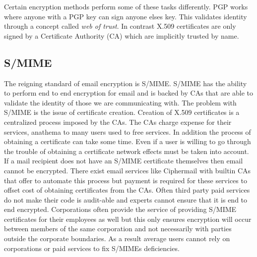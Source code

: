 \documentclass[11pt]{article}
\begin{document}
Certain encryption methods perform some of these tasks differently. PGP works where anyone with a PGP key can sign anyone elses key. This validates identity through a concept called \textit{web of trust}. In contrast X.509 certificates are only signed by a Certificate Authority (CA) which are implicitly trusted by name.

\subsection{S/MIME}
\par The reigning standard of email encryption is S/MIME. S/MIME has the ability to perform end to end encryption for email and is backed by CAs that are able to validate the identity of those we are communicating with. The problem with S/MIME is the issue of certificate creation. Creation of X.509 certificates is a centralized process imposed by the CAs\cite{garfinkel2005johnny}. The CAs charge expense for their services, anathema to many users used to free services. In addition the process of obtaining a certificate can take some time. Even if a user is willing to go through the trouble of obtaining a certificate network effects must be taken into account. If a mail recipient does not have an S/MIME certificate themselves then email cannot be encrypted. There exist email services like Ciphermail with builtin CAs \cite{ciphermail-gateway} that offer to automate this process but payment is required for these services to offset cost of obtaining certificates from the CAs. Often third party paid services do not make their code is audit-able and experts cannot ensure that it is end to end encrypted. Corporations often provide the service of providing S/MIME certificates for their employees as well but this only ensures encryption will occur between members of the same corporation and not necessarily with parties outside the corporate boundaries. As a result average users cannot rely on corporations or paid services to fix S/MIMEs deficiencies.
\end{document}

